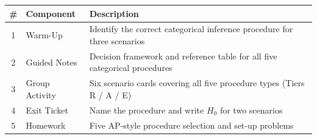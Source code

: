 \documentclass[10pt]{article}
\begin{document}
\begin{tocbox}
\small
\renewcommand{\arraystretch}{1.5}
\begin{tabularx}{\linewidth}{@{} c l X @{}}
\rowcolor{sky}
\textbf{\#} & \textbf{Component} & \textbf{Description} \\
\midrule
1 & Warm-Up        & Identify the correct categorical inference procedure for three scenarios \\
2 & Guided Notes   & Decision framework and reference table for all five categorical procedures \\
3 & Group Activity & Six scenario cards covering all five procedure types (Tiers R / A / E) \\
4 & Exit Ticket    & Name the procedure and write $H_0$ for two scenarios \\
5 & Homework       & Five AP-style procedure selection and set-up problems \\
\end{tabularx}
\end{tocbox}
\end{document}
